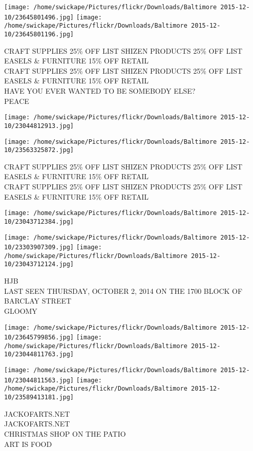 \documentclass[10pt,letterpaper]{article}
\begin{document}
\texttt{[image: /home/swickape/Pictures/flickr/Downloads/Baltimore 2015-12-10/23645801496.jpg]}
\texttt{[image: /home/swickape/Pictures/flickr/Downloads/Baltimore 2015-12-10/23645801196.jpg]}

CRAFT SUPPLIES 25\% OFF LIST SHIZEN PRODUCTS 25\% OFF LIST EASELS \& FURNITURE 15\% OFF RETAIL\\
CRAFT SUPPLIES 25\% OFF LIST SHIZEN PRODUCTS 25\% OFF LIST EASELS \& FURNITURE 15\% OFF RETAIL\\
HAVE YOU EVER WANTED TO BE SOMEBODY ELSE?\\
PEACE
\pagebreak

\texttt{[image: /home/swickape/Pictures/flickr/Downloads/Baltimore 2015-12-10/23044812913.jpg]}

\vspace{0.25in}
\texttt{[image: /home/swickape/Pictures/flickr/Downloads/Baltimore 2015-12-10/23563325872.jpg]}

CRAFT SUPPLIES 25\% OFF LIST SHIZEN PRODUCTS 25\% OFF LIST EASELS \& FURNITURE 15\% OFF RETAIL\\
CRAFT SUPPLIES 25\% OFF LIST SHIZEN PRODUCTS 25\% OFF LIST EASELS \& FURNITURE 15\% OFF RETAIL
\pagebreak

\texttt{[image: /home/swickape/Pictures/flickr/Downloads/Baltimore 2015-12-10/23043712384.jpg]}

\vspace{0.25in}
\texttt{[image: /home/swickape/Pictures/flickr/Downloads/Baltimore 2015-12-10/23303907309.jpg]}
\texttt{[image: /home/swickape/Pictures/flickr/Downloads/Baltimore 2015-12-10/23043712124.jpg]}

HJB\\
LAST SEEN THURSDAY, OCTOBER 2, 2014 ON THE 1700 BLOCK OF BARCLAY STREET\\
GLOOMY
\pagebreak

\texttt{[image: /home/swickape/Pictures/flickr/Downloads/Baltimore 2015-12-10/23645799856.jpg]}
\texttt{[image: /home/swickape/Pictures/flickr/Downloads/Baltimore 2015-12-10/23044811763.jpg]}

\texttt{[image: /home/swickape/Pictures/flickr/Downloads/Baltimore 2015-12-10/23044811563.jpg]}
\texttt{[image: /home/swickape/Pictures/flickr/Downloads/Baltimore 2015-12-10/23589413181.jpg]}

JACKOFARTS.NET\\
JACKOFARTS.NET\\
CHRISTMAS SHOP ON THE PATIO\\
ART IS FOOD
\pagebreak
\end{document}

